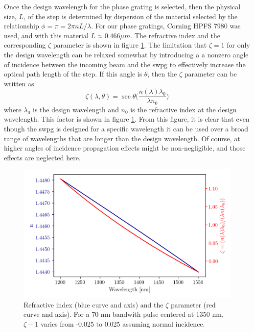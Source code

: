 Once the design wavelength for the phase grating is selected, then the physical size, $L$, of the step is determined by dispersion of the material selected by the relationship $\phi=\pi=2\pi n L/\lambda$.  For our phase gratings, Corning HPFS 7980 was used, and with this material $L\approx0.466\mu m$.  The refractive index and the corresponding $\zeta$ parameter is shown in figure \ref{fig:n_zeta}. The limitation that $\zeta=1$ for only the design wavelength can be relaxed somewhat by introducing a a nonzero angle of incidence between the incoming beam and the \gls{swpg} to effectively increase the optical path length of the step.  If this angle is $\theta$, then the $\zeta$ parameter can be written as
\begin{equation}
\label{eqn:zeta_theta}
	\zeta(\lambda,\theta)=\sec\theta\bigg(  \frac{n(\lambda)\lambda_0}{\lambda n_0} \bigg)
\end{equation}
where $\lambda_0$ is the design wavelength and $n_0$ is the refractive index at the design wavelength.  This factor is shown in figure \ref{fig:n_zeta}.  From this figure, it is clear that even though the \gls{swpg} is designed for a specific wavelength it can be used over a broad range of wavelengths that are longer than the design wavelength. Of course, at higher angles of incidence propagation effects might be non-negligible, and those effects are neglected here. 
\begin{figure}
	\centering
	\includegraphics[width=1.0\textwidth]{figures/Two_source/n_zeta.png}
	\caption{Refractive index (blue curve and axis) and the $\zeta$ parameter (red curve and axis).  For a 70 nm bandwith pulse centered at 1350 nm, $\zeta - 1$ varies from -0.025 to 0.025 assuming normal incidence.}
	\label{fig:n_zeta}
\end{figure}


